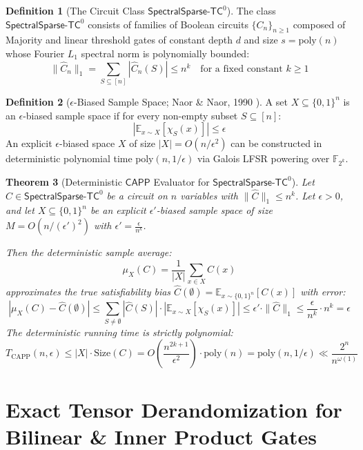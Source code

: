 \documentclass[11pt,a4paper]{article}
\newtheorem{theorem}{Theorem}[section]
\theoremstyle{definition}
\newtheorem{definition}[theorem]{Definition}
\theoremstyle{remark}
\newcommand{\poly}{\mathrm{poly}}
\newcommand{\CAPP}{\mathsf{CAPP}}
\newcommand{\E}{\mathbb{E}}
\newcommand{\SparseTC}{\mathsf{SpectralSparse}\text{-}\mathsf{TC}^0}
\begin{document}
\begin{definition}[The Circuit Class $\SparseTC$]
The class $\SparseTC$ consists of families of Boolean circuits $\{C_n\}_{n \ge 1}$ composed of Majority and linear threshold gates of constant depth $d$ and size $s = \poly(n)$ whose Fourier $L_1$ spectral norm is polynomially bounded:
\[
\| \hat{C}_n \|_1 = \sum_{S \subseteq [n]} |\hat{C}_n(S)| \le n^k \quad \text{for a fixed constant } k \ge 1
\]
\end{definition}

\begin{definition}[$\epsilon$-Biased Sample Space; Naor \& Naor, 1990 \cite{naor90}]
A set $X \subseteq \{0,1\}^n$ is an $\epsilon$-biased sample space if for every non-empty subset $S \subseteq [n]$:
\[
\left| \E_{x \sim X} [\chi_S(x)] \right| \le \epsilon
\]
An explicit $\epsilon$-biased space $X$ of size $|X| = O(n / \epsilon^2)$ can be constructed in deterministic polynomial time $\poly(n, 1/\epsilon)$ via Galois LFSR powering over $\mathbb{F}_{2^k}$.
\end{definition}

\begin{theorem}[Deterministic $\CAPP$ Evaluator for $\SparseTC$]\label{thm:deterministic_capp}
Let $C \in \SparseTC$ be a circuit on $n$ variables with $\| \hat{C} \|_1 \le n^k$. Let $\epsilon > 0$, and let $X \subseteq \{0,1\}^n$ be an explicit $\epsilon'$-biased sample space of size $M = O(n / (\epsilon')^2)$ with $\epsilon' = \frac{\epsilon}{n^k}$.

Then the deterministic sample average:
\[
\mu_X(C) = \frac{1}{|X|} \sum_{x \in X} C(x)
\]
approximates the true satisfiability bias $\hat{C}(\emptyset) = \E_{x \sim \{0,1\}^n}[C(x)]$ with error:
\[
\left| \mu_X(C) - \hat{C}(\emptyset) \right| \le \sum_{S \neq \emptyset} |\hat{C}(S)| \cdot \left| \E_{x \sim X}[\chi_S(x)] \right| \le \epsilon' \cdot \| \hat{C} \|_1 \le \frac{\epsilon}{n^k} \cdot n^k = \epsilon
\]
The deterministic running time is strictly polynomial:
\[
T_{\mathrm{CAPP}}(n, \epsilon) \le |X| \cdot \mathrm{Size}(C) = O\left( \frac{n^{2k+1}}{\epsilon^2} \right) \cdot \poly(n) = \poly(n, 1/\epsilon) \ll \frac{2^n}{n^{\omega(1)}}
\]
\end{theorem}

\section{Exact Tensor Derandomization for Bilinear & Inner Product Gates}
\end{document}
